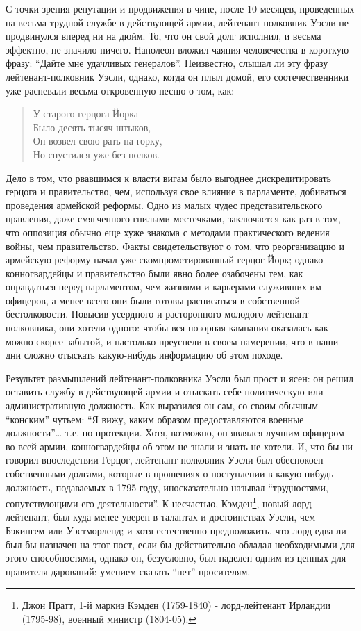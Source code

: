\documentclass[
  oneside,
  12pt,
  titlepage]{book}
\begin{document}
С точки зрения репутации и продвижения в чине, после 10 месяцев, проведенных на весьма трудной службе в действующей армии, лейтенант-полковник Уэсли не продвинулся вперед ни на дюйм. То, что он свой долг исполнил, и весьма эффектно, не значило ничего. Наполеон вложил чаяния человечества в короткую фразу: ``Дайте мне удачливых генералов''. Неизвестно, слышал ли эту фразу лейтенант-полковник Уэсли, однако, когда он плыл домой, его соотечественники уже распевали весьма откровенную песню о том, как:

\begin{quote}
У старого герцога Йорка\\
Было десять тысяч штыков,\\
Он возвел свою рать на горку,\\
Но спустился уже без полков.
\end{quote}

Дело в том, что рвавшимся к власти вигам было выгоднее дискредитировать герцога и правительство, чем, используя свое влияние в парламенте, добиваться проведения армейской реформы. Одно из малых чудес представительского правления, даже смягченного гнилыми местечками, заключается как раз в том, что оппозиция обычно еще хуже знакома с методами практического ведения войны, чем правительство. Факты свидетельствуют о том, что реорганизацию и армейскую реформу начал уже скомпрометированный герцог Йорк; однако конногвардейцы и правительство были явно более озабочены тем, как оправдаться перед парламентом, чем жизнями и карьерами служивших им офицеров, а менее всего они были готовы расписаться в собственной бестолковости. Повысив усердного и расторопного молодого лейтенант-полковника, они хотели одного: чтобы вся позорная кампания оказалась как можно скорее забытой, и настолько преуспели в своем намерении, что в наши дни сложно отыскать какую-нибудь информацию об этом походе.

Результат размышлений лейтенант-полковника Уэсли был прост и ясен: он решил оставить службу в действующей армии и отыскать себе политическую или административную должность. Как выразился он сам, со своим обычным ``конским'' чутьем: ``Я вижу, каким образом предоставляются военные должности''\ldots{} т.е. по протекции. Хотя, возможно, он являлся лучшим офицером во всей армии, конногвардейцы об этом не знали и знать не хотели. И, что бы ни говорил впоследствии Герцог, лейтенант-полковник Уэсли был обеспокоен собственными долгами, которые в прошениях о поступлении в какую-нибудь должность, подаваемых в 1795 году, иносказательно называл ``трудностями, сопутствующими его деятельности''. К несчастью, Кэмден\footnote{Джон Пратт, 1-й маркиз Кэмден (1759-1840) - лорд-лейтенант Ирландии (1795-98), военный министр (1804-05).}, новый лорд-лейтенант, был куда менее уверен в талантах и достоинствах Уэсли, чем Бэкингем или Уэстморленд; и хотя естественно предположить, что лорд едва ли был бы назначен на этот пост, если бы действительно обладал необходимыми для этого способностями, однако он, безусловно, был наделен одним из ценных для правителя дарований: умением сказать ``нет'' просителям.
\end{document}
